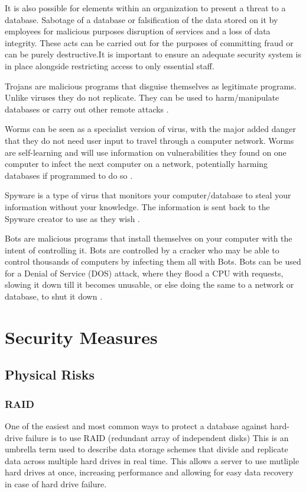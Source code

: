 \documentclass[11pt, twocolumn]{article}
\begin{document}
It is also possible for elements within an organization to present a threat to a database. Sabotage of a database or falsification of the data stored on it by  employees for malicious purposes disruption of services and a loss of data integrity. These acts can be carried out for the purposes of committing fraud or can be purely destructive.It is important to ensure an adequate security system is in place alongside restricting access to only essential staff.

Trojans are malicious programs that disguise themselves as legitimate programs.  Unlike viruses they do not replicate.  They can be used to harm/manipulate databases or carry out other remote attacks \cite{Bas}.

Worms can be seen as a specialist version of virus, with the major added danger that they do not need user input to travel through a computer network. Worms are self-learning and will use information on vulnerabilities they found on one computer to infect the next computer on a network, potentially harming databases if programmed to do so \cite{Bas}.

Spyware is a type of virus that monitors your computer/database to steal your information without your knowledge.  The information is sent back to the Spyware creator to use as they wish \cite{Bas}.

Bots are malicious programs that install themselves on your computer with the intent of controlling it.  Bots are controlled by a cracker who may be able to control thousands of computers by infecting them all with Bots.  Bots can be used for a Denial of Service (DOS) attack, where they flood a CPU with requests, slowing it down till it becomes unusable, or else doing the same to a network or database, to shut it down \cite{Bas}. 


\section{Security Measures}

\subsection{Physical Risks}
\subsubsection{RAID}
One of the easiest and most common ways to protect a database against hard-drive failure is to use RAID (redundant array of independent disks) \cite{raid} This is an umbrella term used to describe data storage schemes that divide and replicate data across multiple hard drives in real time. This allows a server to use mutliple hard drives at once, increasing performance and allowing for easy data recovery in case of hard drive failure.
\end{document}
